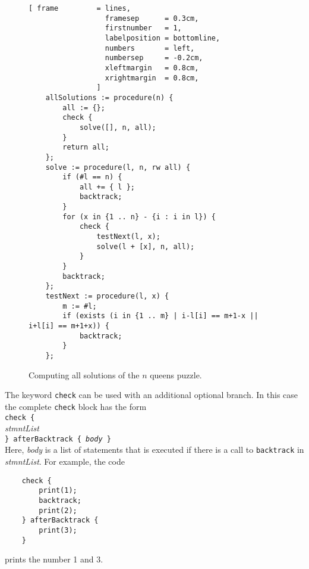 \begin{figure}[!ht]
\centering
\begin{Verbatim}[ frame         = lines, 
                  framesep      = 0.3cm, 
                  firstnumber   = 1,
                  labelposition = bottomline,
                  numbers       = left,
                  numbersep     = -0.2cm,
                  xleftmargin   = 0.8cm,
                  xrightmargin  = 0.8cm,
                ]
    allSolutions := procedure(n) {
        all := {};
        check {
            solve([], n, all);
        }
        return all;
    };
    solve := procedure(l, n, rw all) { 
        if (#l == n) {
            all += { l };
            backtrack;
        }
        for (x in {1 .. n} - {i : i in l}) {
            check {
                testNext(l, x);
                solve(l + [x], n, all);
            } 
        }
        backtrack;
    };
    testNext := procedure(l, x) {
        m := #l;
        if (exists (i in {1 .. m} | i-l[i] == m+1-x || i+l[i] == m+1+x)) {
            backtrack;
        }
    };
\end{Verbatim}
\vspace*{-0.3cm}
\caption{Computing all solutions of the $n$ queens puzzle.}
\label{fig:queens-all.stlx}
\end{figure}


The keyword \texttt{check} can be used with an additional optional branch.  In this case the
complete \texttt{check} block has the form
\\[0.2cm]
\hspace*{1.3cm}
\texttt{check \{} 
\\
\hspace*{1.8cm}
\textsl{stmntList}
\\
\hspace*{1.3cm}
\texttt{\} afterBacktrack \{ \textsl{body} \}}
\\[0.2cm]
Here, \textsl{body} is a list of statements that is executed if there is a call to \texttt{backtrack} in
\textsl{stmntList}.  For example, the code
\begin{verbatim}
    check { 
        print(1); 
        backtrack; 
        print(2); 
    } afterBacktrack { 
        print(3); 
    }
\end{verbatim}
prints the number 1 and 3.




